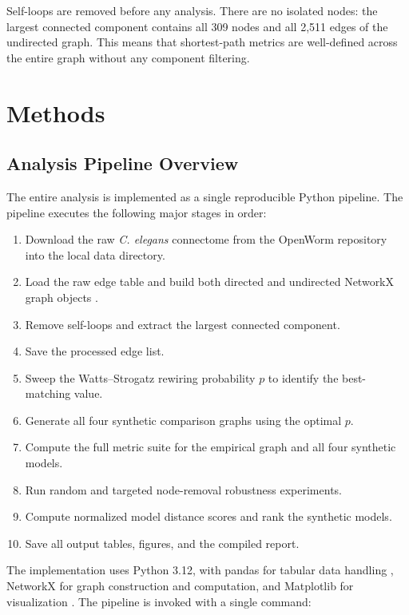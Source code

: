 \documentclass[12pt,a4paper]{report}
\begin{document}
Self-loops are removed before any analysis. There are no isolated nodes: the largest connected component contains all 309 nodes and all 2{,}511 edges of the undirected graph. This means that shortest-path metrics are well-defined across the entire graph without any component filtering.


\chapter{Methods}

\section{Analysis Pipeline Overview}

The entire analysis is implemented as a single reproducible Python pipeline. The pipeline executes the following major stages in order:

\begin{enumerate}
    \item Download the raw \textit{C. elegans} connectome from the OpenWorm repository into the local data directory.
    \item Load the raw edge table and build both directed and undirected NetworkX graph objects \cite{hagberg2008networkx}.
    \item Remove self-loops and extract the largest connected component.
    \item Save the processed edge list.
    \item Sweep the Watts--Strogatz rewiring probability $p$ to identify the best-matching value.
    \item Generate all four synthetic comparison graphs using the optimal $p$.
    \item Compute the full metric suite for the empirical graph and all four synthetic models.
    \item Run random and targeted node-removal robustness experiments.
    \item Compute normalized model distance scores and rank the synthetic models.
    \item Save all output tables, figures, and the compiled report.
\end{enumerate}

The implementation uses Python 3.12, with pandas for tabular data handling \cite{mckinney2010pandas}, NetworkX for graph construction and computation, and Matplotlib for visualization \cite{hunter2007matplotlib}. The pipeline is invoked with a single command:
\end{document}

